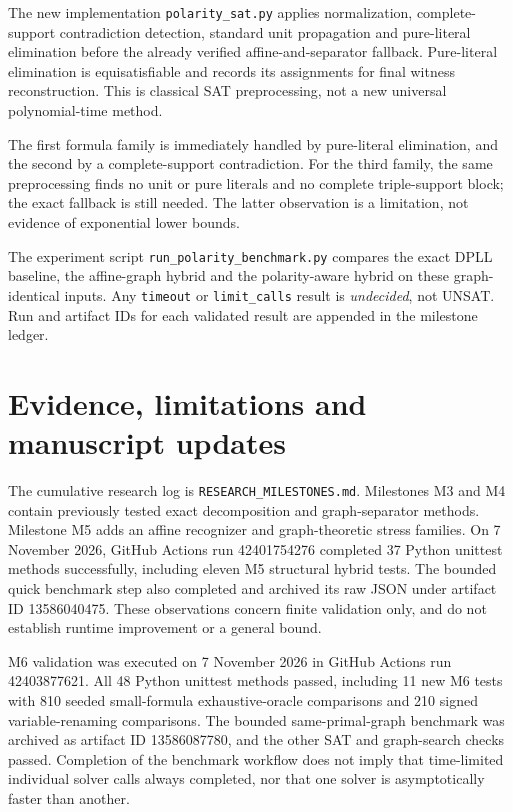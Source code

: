\documentclass[11pt,a4paper]{article}
\begin{document}
The new implementation \texttt{polarity\_sat.py} applies
normalization, complete-support contradiction detection,
standard unit propagation and pure-literal elimination before
the already verified affine-and-separator fallback. Pure-literal
elimination is equisatisfiable and records its assignments
for final witness reconstruction. This is classical SAT
preprocessing, not a new universal polynomial-time method.

The first formula family is immediately handled by pure-literal
elimination, and the second by a complete-support contradiction.
For the third family, the same preprocessing finds no unit
or pure literals and no complete triple-support block;
the exact fallback is still needed. The latter observation
is a limitation, not evidence of exponential lower bounds.

The experiment script \texttt{run\_polarity\_benchmark.py}
compares the exact DPLL baseline, the affine-graph hybrid and
the polarity-aware hybrid on these graph-identical inputs.
Any \texttt{timeout} or \texttt{limit\_calls} result is
\emph{undecided}, not UNSAT. Run and artifact IDs for each
validated result are appended in the milestone ledger.

\section{Evidence, limitations and manuscript updates}
The cumulative research log is
\texttt{RESEARCH\_MILESTONES.md}. Milestones M3 and M4 contain
previously tested exact decomposition and graph-separator methods.
Milestone M5 adds an affine recognizer and graph-theoretic stress
families. On 7 November 2026, GitHub Actions run 42401754276
completed 37 Python unittest methods successfully, including eleven
M5 structural hybrid tests. The bounded quick benchmark step
also completed and archived its raw JSON under artifact ID
13586040475. These observations concern finite validation only,
and do not establish runtime improvement or a general bound.

M6 validation was executed on 7 November 2026 in GitHub Actions
run 42403877621. All 48 Python unittest methods passed, including
11 new M6 tests with 810 seeded small-formula exhaustive-oracle
comparisons and 210 signed variable-renaming comparisons. The
bounded same-primal-graph benchmark was archived as artifact ID
13586087780, and the other SAT and graph-search checks passed.
Completion of the benchmark workflow does not imply that
time-limited individual solver calls always completed, nor
that one solver is asymptotically faster than another.
\end{document}
